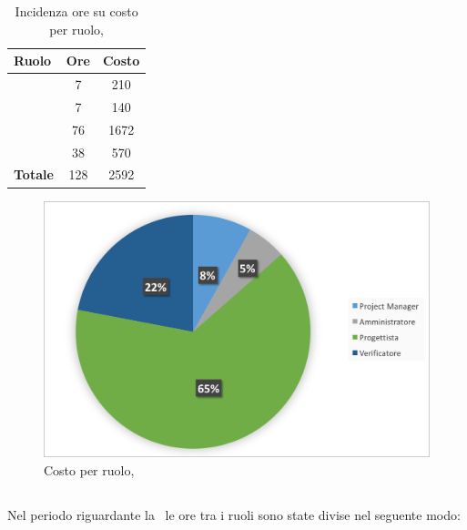 \begin{table}[h]
	\begin{center}
		\begin{tabular}{|l|c|c|}
			\hline
			\textbf{Ruolo}	& \textbf{Ore} &	\textbf{Costo}	 \\
			\hline
			\textit{\Pm}	&	7	&	210		\\
			\hline
			\textit{\Am}	&	7	&	140		\\
			\hline
			\textit{\Prog}	&	76	&	1672	\\
			\hline
			\textit{\Ver}	&	38	&	570		\\
			\hline
			\textbf{Totale}	&	128	&	2592	\\
			\hline
		\end{tabular}
	\end{center}
	\caption{Incidenza ore su costo per ruolo, \PD}
\end{table}

\begin{figure}[H]
	\centering 
	\includegraphics[scale=0.7]{Immagini/GraficiTorteSezione6/PD.png}
	\caption{Costo per ruolo, \PD}
\end{figure}

\newpage
\subsection{\COD}
Nel periodo riguardante la \COD\ le ore tra i ruoli sono state divise nel seguente modo:

